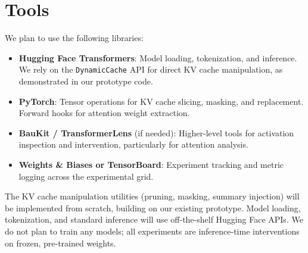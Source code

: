 \documentclass[11pt,a4paper]{article}
\begin{document}
\section{Tools}

We plan to use the following libraries:

\begin{itemize}
    \item \textbf{Hugging Face Transformers}: Model loading, tokenization, and inference. We rely on the \texttt{DynamicCache} API for direct KV cache manipulation, as demonstrated in our prototype code.
    \item \textbf{PyTorch}: Tensor operations for KV cache slicing, masking, and replacement. Forward hooks for attention weight extraction.
    \item \textbf{BauKit / TransformerLens} (if needed): Higher-level tools for activation inspection and intervention, particularly for attention analysis.
    \item \textbf{Weights \& Biases or TensorBoard}: Experiment tracking and metric logging across the experimental grid.
\end{itemize}

The KV cache manipulation utilities (pruning, masking, summary injection) will be implemented from scratch, building on our existing prototype.
Model loading, tokenization, and standard inference will use off-the-shelf Hugging Face APIs.
We do not plan to train any models; all experiments are inference-time interventions on frozen, pre-trained weights.



\footnotesize

\end{document}
